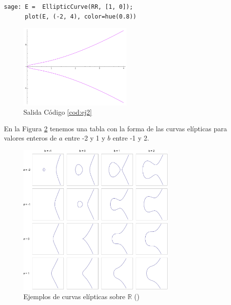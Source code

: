 \documentclass[11pt]{article}
\begin{document}
\begin{lstlisting}[label={cod:ej2}, caption={Curva elíptica $y^2=x^3+x$}, morekeywords={sage}]
sage: E =  EllipticCurve(RR, [1, 0]);
      plot(E, (-2, 4), color=hue(0.8))
\end{lstlisting}

\begin{figure}[H]
    \centering
    \includegraphics[width=0.5\textwidth]{ej2}
    \caption{Salida Código \ref{cod:ej2}}
    \label{fig:ej2}
\end{figure}

En la Figura \ref{fig:EllipticCurveCatalog} tenemos una tabla con la forma de las curvas elípticas para valores enteros de $a$ entre -2 y 1 y $b$ entre -1 y 2.

\begin{figure}[H]
    \centering
    \includegraphics[width=0.7\textwidth]{EllipticCurveCatalog}
    \caption{Ejemplos de curvas elípticas sobre $\mathbb{R}$ (\cite{tos_elliptic_2008})}
    \label{fig:EllipticCurveCatalog}
\end{figure}
\end{document}
